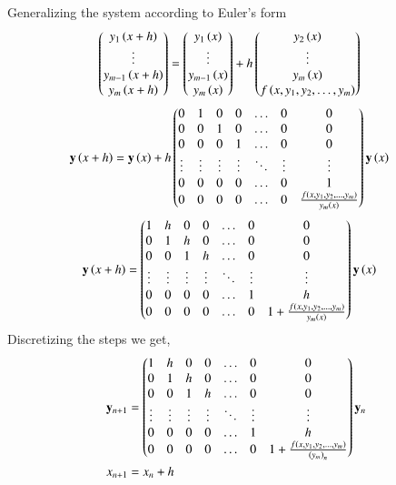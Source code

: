 \documentclass[journal]{IEEEtran}
\begin{document}
Generalizing the system according to Euler's form\\
\begin{align}
  \begin{pmatrix}y_1\left(x+h\right) \\ \vdots \\ y_{m-1}\left(x+h\right) \\ y_m\left(x+h\right)\end{pmatrix} &=\begin{pmatrix}y_1\left(x\right) \\ \vdots \\ y_{m-1}\left(x\right) \\ y_m\left(x\right)\end{pmatrix} + h\begin{pmatrix}y_2\left(x\right) \\ \vdots \\ y_m\left(x\right) \\f\left(x, y_1, y_2, \dots, y_m\right) \end{pmatrix}
\end{align}
\begin{align}
  \mathbf{y}\left(x+h\right) &= \mathbf{y}\left(x\right) + h\begin{pmatrix}0 & 1 & 0 & 0 & \dots & 0 & 0\\ 0 & 0 & 1 & 0 & \dots & 0 & 0\\0 & 0 & 0 & 1 & \dots & 0 & 0\\\vdots & \vdots & \vdots & \vdots& \ddots & \vdots & \vdots\\
  0 & 0 & 0 & 0 & \dots & 0 & 1\\0 & 0 & 0 & 0 & \dots & 0 &\frac{f\left(x, y_1, y_2, \dots, y_m\right)}{y_m\left(x\right)}\end{pmatrix}\mathbf{y}\left(x\right)
  \end{align}
  \begin{align}
  \mathbf{y}\left(x+h\right) &= \begin{pmatrix}1 & h & 0 & 0 & \dots & 0 & 0\\ 0 & 1 & h & 0 & \dots & 0 & 0\\0 & 0 & 1 & h & \dots & 0 & 0\\\vdots & \vdots & \vdots & \vdots& \ddots & \vdots & \vdots\\
  0 & 0 & 0 & 0 & \dots & 1 & h\\0 & 0 & 0 & 0 & \dots & 0 & 1+\frac{f\left(x, y_1, y_2, \dots, y_m\right)}{y_m\left(x\right)}\end{pmatrix}\mathbf{y}\left(x\right)
\end{align}
Discretizing the steps we get,
\begin{align}
  \mathbf{y}_{n+1}&=\begin{pmatrix}1 & h & 0 & 0 & \dots & 0 & 0\\ 0 & 1 & h & 0 & \dots & 0 & 0\\0 & 0 & 1 & h & \dots & 0 & 0\\\vdots & \vdots & \vdots & \vdots& \ddots & \vdots & \vdots\\
  0 & 0 & 0 & 0 & \dots & 1 & h\\0 & 0 & 0 & 0 & \dots & 0 &1+\frac{f\left(x, y_1, y_2, \dots, y_m\right)}{\left(y_m\right)_n}\end{pmatrix}\mathbf{y}_{n}\\
    x_{n+1}&=x_n+h  
\end{align}
\end{document}
